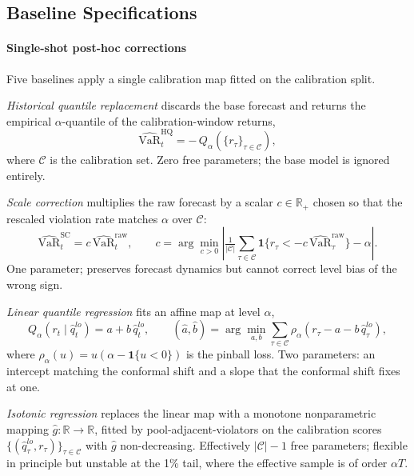 \documentclass[preprint,11pt,authoryear]{elsarticle}
\newcommand{\VaR}{\mathrm{VaR}}
\newcommand{\1}{\boldsymbol{1}}
\begin{document}
\subsection{Baseline Specifications}
\label{app:baseline-specs}

\paragraph*{Single-shot post-hoc corrections}
Five baselines apply a single calibration map fitted on the
calibration split.

\textit{Historical quantile replacement} discards the base forecast
and returns the empirical $\alpha$-quantile of the calibration-window
returns,
\begin{equation}
	\label{eq:hq}
	\widehat{\VaR}_t^{\mathrm{HQ}}
	=
	-\,Q_{\alpha}\!\left(\{r_\tau\}_{\tau\in\mathcal C}\right),
\end{equation}
where $\mathcal C$ is the calibration set. Zero free parameters; the
base model is ignored entirely.

\textit{Scale correction} multiplies the raw forecast by a scalar
$c\in\mathbb R_{+}$ chosen so that the rescaled violation rate matches
$\alpha$ over $\mathcal C$:
\begin{equation}
	\label{eq:sc}
	\widehat{\VaR}_t^{\mathrm{SC}} = c\,\widehat{\VaR}_t^{\mathrm{raw}},
	\qquad
	c=\arg\min_{c>0}
	\left|
	\tfrac{1}{|\mathcal C|}\sum_{\tau\in\mathcal C}
	\mathbf 1\{r_\tau<-c\,\widehat{\VaR}_\tau^{\mathrm{raw}}\}-\alpha
	\right|.
\end{equation}
One parameter; preserves forecast dynamics but cannot correct level
bias of the wrong sign.

\textit{Linear quantile regression} fits an affine map at level
$\alpha$,
\begin{equation}
	\label{eq:qr_baseline}
	Q_\alpha(r_t\mid \hat q_t^{lo})
	= a + b\,\hat q_t^{lo},
	\qquad
	(\hat a,\hat b)
	=\arg\min_{a,b}
	\sum_{\tau\in\mathcal C}
	\rho_\alpha\!\left(r_\tau-a-b\,\hat q_\tau^{lo}\right),
\end{equation}
where $\rho_\alpha(u)=u(\alpha-\mathbf 1\{u<0\})$ is the pinball loss.
Two parameters: an intercept matching the conformal shift and a slope
that the conformal shift fixes at one.

\textit{Isotonic regression} replaces the linear map with a monotone
nonparametric mapping $\widehat g:\mathbb R\to\mathbb R$, fitted by
pool-adjacent-violators on the calibration scores
$\{(\hat q_\tau^{lo},r_\tau)\}_{\tau\in\mathcal C}$ with $\widehat g$
non-decreasing. Effectively $|\mathcal C|-1$ free parameters; flexible
in principle but unstable at the 1\% tail, where the effective sample
is of order $\alpha T$.
\end{document}
